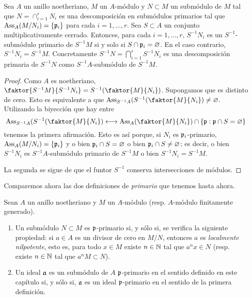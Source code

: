 \documentclass[../main.tex]{subfiles}
\begin{document}
\begin{proposition}
Sea $A$ un anillo noetheriano, $M$ un $A$-módulo y $N\subset M$ un submódulo de $M$ tal que $N=\cap_{i=1}^rN_i$ es una descomposición en submódulos primarios tal que $\text{Ass}_A(M/N_i)=\{\mathfrak{p}_i\}$ para cada $i=1,\dots,r$. Sea $S\subset A$ un conjunto multiplicativamente cerrado. Entonces, para cada $i=1,\dots,r$, $S^{-1}N_i$ es un $S^{-1}$-submódulo primario de $S^{-1}M$ si y solo si $S\cap\mathfrak{p}_i=\varnothing$. En el caso contrario, $S^{-1}N_i=S^{-1}M$. Concretamente $S^{-1}N=\bigcap_{i=1}^rS^{-1}N_i$ es una descomposición primaria de $S^{-1}N$ como $S^{-1}A$-submódulo de $S^{-1}M.$
\end{proposition}
\begin{proof}
Como $A$ es noetheriano, $\faktor{S^{-1}M}{S^{-1}N_i}=S^{-1}(\faktor{M}{N_i})$. Supongamos que es distinto de cero. Esto es equivalente a que $\Ass_{S^{-1}A}(S^{-1}(\faktor{M}{N_i})\neq\varnothing.$ Utilizando la biyección que hay entre$$\Ass_{S^{-1}A}(S^{-1}(\faktor{M}{N_i})\longleftrightarrow\Ass_A(\faktor{M}{N_i})\cap\{\p:\p\cap S=\varnothing\}$$tenemos la primera afirmación. Esto es así porque, si $N_i$ es $\mathfrak{p}_i$-primario, $\text{Ass}_A(M/N_i)=\{\mathfrak{p}_i\}$ y o bien $\mathfrak{p}_i\cap S=\varnothing$ o bien $\mathfrak{p}_i\cap S\neq\varnothing$; es decir, o bien $S^{-1}N_i$ es $S^{-1}A$-submódulo primario de $S^{-1}M$ o bien $S^{-1}N_i=S^{-1}M.$

La segunda se sigue de que el funtor $S^{-1}$ conserva intersecciones de módulos.
\end{proof}

Comparemos ahora las dos definiciones de \textit{primario} que tenemos hasta ahora.

\begin{proposition}
Sean $A$ un anillo noetheriano y $M$ un $A$-módulo (resp. $A$-módulo finitamente generado).
\begin{enumerate}
    \item Un submódulo $N\subset M$ es $\mathfrak{p}$-primario si, y sólo si, se verifica la siguiente propiedad: si $a\in A$ es un divisor de cero en $M/N$, entonces $a$ es \textit{localmente nilpotente}, esto es, para todo $x\in M$ existe $n\in\mathbb{N}$ tal que $a^nx\in N$ (resp. existe $n\in\mathbb{N}$ tal que $a^nM\subset N$).
    \item Un ideal $\mathfrak{a}$ es un submódulo de $A$ $\mathfrak{p}$-primario en el sentido definido en este capítulo si, y sólo si, $\mathfrak{a}$ es un ideal $\mathfrak{p}$-primario en el sentido de la primera definición.
\end{enumerate}
\end{proposition}
\end{document}
